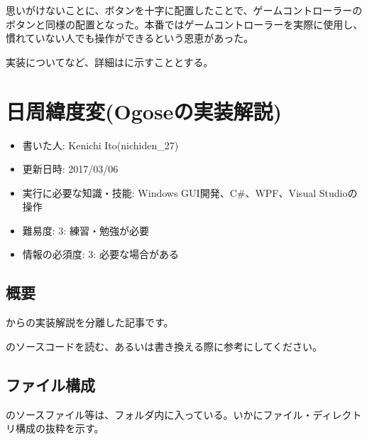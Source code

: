 \documentclass[letterpaper,10pt,dvipdfmx]{sphinxmanual}
\begin{document}
思いがけないことに、ボタンを十字に配置したことで、ゲームコントローラーのボタンと同様の配置となった。本番ではゲームコントローラーを実際に使用し、慣れていない人でも操作ができるという恩恵があった。

実装についてなど、詳細は{\hyperref[\detokenize{nissyu-idohen/pc-software::doc}]{}}に示すこととする。


\chapter{日周緯度変(Ogoseの実装解説)}
\label{\detokenize{nissyu-idohen/pc-software-code:ogose}}\label{\detokenize{nissyu-idohen/pc-software-code::doc}}\begin{itemize}
\item {} 
書いた人: Kenichi Ito(nichiden\_27)

\item {} 
更新日時: 2017/03/06

\item {} 
実行に必要な知識・技能: Windows GUI開発、C\#、WPF、Visual Studioの操作

\item {} 
難易度: 3: 練習・勉強が必要

\item {} 
情報の必須度: 3: 必要な場合がある

\end{itemize}


\section{概要}
\label{\detokenize{nissyu-idohen/pc-software-code:}}\label{\detokenize{nissyu-idohen/pc-software-code:id1}}
{\hyperref[\detokenize{nissyu-idohen/pc-software::doc}]{}}からの実装解説を分離した記事です。

のソースコードを読む、あるいは書き換える際に参考にしてください。


\section{ファイル構成}
\label{\detokenize{nissyu-idohen/pc-software-code:}}\label{\detokenize{nissyu-idohen/pc-software-code:id2}}
のソースファイル等は、フォルダ内に入っている。いかにファイル・ディレクトリ構成の抜粋を示す。
\end{document}

